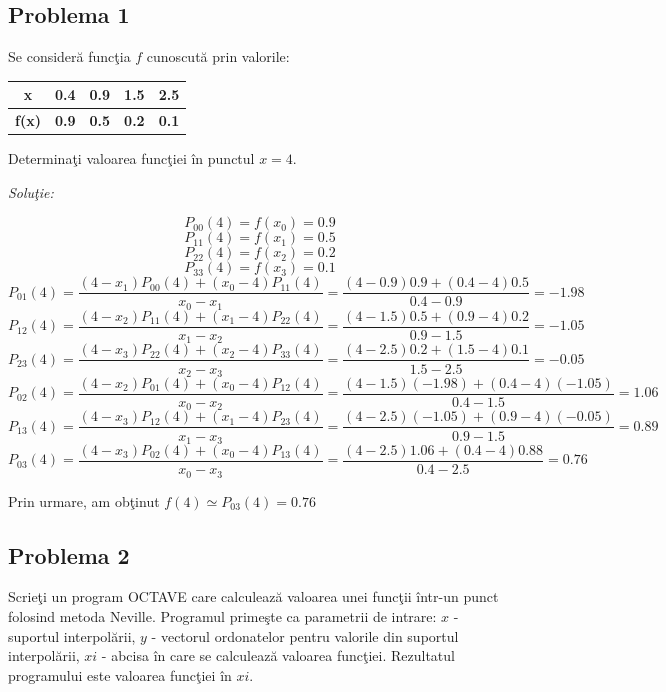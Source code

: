 \documentclass{exam}
\begin{document}
\subsection{Problema 1}

Se consideră funcţia $f$ cunoscută prin valorile:
\begin{center}
	\begin{tabular}{c || c | c | c | c}
		\textbf{x}    & \textbf{0.4} & \textbf{0.9} & \textbf{1.5} & \textbf{2.5} \\
		\hline
		\textbf{f(x)} & \textbf{0.9} & \textbf{0.5} & \textbf{0.2} & \textbf{0.1} \\
	\end{tabular}
\end{center}

Determinaţi valoarea funcţiei în punctul $x=4$.

\textit{Soluţie:}

$$P_{00}(4)=f(x_0)=0.9$$
$$P_{11}(4)=f(x_1)=0.5$$
$$P_{22}(4)=f(x_2)=0.2$$
$$P_{33}(4)=f(x_3)=0.1$$
$$P_{01}(4) = \frac{(4-x_1)P_{00}(4)+(x_0-4)P_{11}(4)}{x_0-x_1} = \frac{(4-0.9)0.9+(0.4-4)0.5}{0.4-0.9} = -1.98$$
$$P_{12}(4) = \frac{(4-x_2)P_{11}(4)+(x_1-4)P_{22}(4)}{x_1-x_2} = \frac{(4-1.5)0.5+(0.9-4)0.2}{0.9-1.5} = -1.05$$
$$P_{23}(4) = \frac{(4-x_3)P_{22}(4)+(x_2-4)P_{33}(4)}{x_2-x_3} = \frac{(4-2.5)0.2+(1.5-4)0.1}{1.5-2.5} = -0.05$$
$$P_{02}(4) = \frac{(4-x_2)P_{01}(4)+(x_0-4)P_{12}(4)}{x_0-x_2} = \frac{(4-1.5)(-1.98)+(0.4-4)(-1.05)}{0.4-1.5} = 1.06$$
$$P_{13}(4) = \frac{(4-x_3)P_{12}(4)+(x_1-4)P_{23}(4)}{x_1-x_3} = \frac{(4-2.5)(-1.05)+(0.9-4)(-0.05)}{0.9-1.5} = 0.89$$
$$P_{03}(4) = \frac{(4-x_3)P_{02}(4)+(x_0-4)P_{13}(4)}{x_0-x_3} = \frac{(4-2.5)1.06+(0.4-4)0.88}{0.4-2.5} = 0.76$$

Prin urmare, am obţinut $f(4) \simeq P_{03}(4) = 0.76$


\subsection{Problema 2}
Scrieţi un program OCTAVE care calculează valoarea unei funcţii într-un punct folosind metoda Neville. Programul primeşte ca parametrii de intrare: $x$ - suportul interpolării, $y$ - vectorul ordonatelor pentru valorile din suportul interpolării, $xi$ - abcisa în care se calculează valoarea funcţiei. Rezultatul programului este valoarea funcţiei în $xi$.
\end{document}
